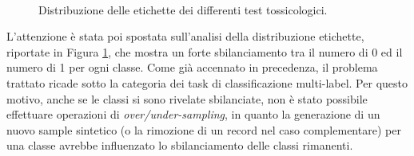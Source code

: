 \begin{figure}[!ht]
	\quad
	\\
	\quad
	\quad	{}\quad
	\caption{Distribuzione delle etichette dei differenti test tossicologici.}
	\label{fig:class_distribution}
\end{figure}
L'attenzione è stata poi spostata sull'analisi della distribuzione etichette, riportate in Figura \ref{fig:class_distribution}, che mostra un forte sbilanciamento tra il numero di 0 ed il numero di 1 per ogni classe. Come già accennato in precedenza, il problema trattato ricade sotto la categoria dei task di classificazione multi-label. Per questo motivo, anche se le classi si sono rivelate sbilanciate, non è stato possibile effettuare operazioni di \textit{over/under-sampling}, in quanto la generazione di un nuovo sample sintetico (o la rimozione di un record nel caso complementare) per una classe avrebbe influenzato lo sbilanciamento delle classi rimanenti. \\
